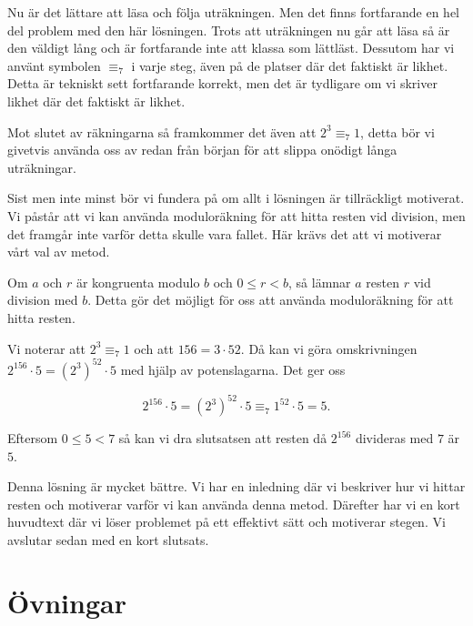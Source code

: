 \documentclass[titlepage]{article}
\begin{document}
Nu är det lättare att läsa och följa uträkningen. Men det finns fortfarande en hel del problem med den här lösningen. Trots att uträkningen nu går att läsa så är den väldigt lång och är fortfarande inte att klassa som lättläst. Dessutom har vi använt symbolen $\equiv_7$ i varje steg, även på de platser där det faktiskt är likhet. Detta är tekniskt sett fortfarande korrekt, men det är tydligare om vi skriver likhet där det faktiskt är likhet. 

Mot slutet av räkningarna så framkommer det även att $2^3 \equiv_7 1$, detta bör vi givetvis använda oss av redan från början för att slippa onödigt långa uträkningar.

Sist men inte minst bör vi fundera på om allt i lösningen är tillräckligt motiverat. Vi påstår att vi kan använda moduloräkning för att hitta resten vid division, men det framgår inte varför detta skulle vara fallet. Här krävs det att vi motiverar vårt val av metod.

\begin{center}
    \begin{tcolorbox}[width=\linewidth,colback={green!25!white},title={\textbf{Lösning 3 - Bättre}},outer arc=0mm,colupper=black]
        Om $a$ och $r$ är kongruenta modulo $b$ och $0\leq r<b$, så lämnar $a$ resten $r$ vid division med $b$. Detta gör det möjligt för oss att använda moduloräkning för att hitta resten. \vspace{2mm}

        Vi noterar att $2^3 \equiv_7 1$ och att $156 = 3\cdot 52$. Då kan vi göra omskrivningen $2^{156}\cdot 5 = (2^3)^{52} \cdot 5$ med hjälp av potenslagarna. Det ger oss

        $$2^{156}\cdot 5 = (2^3)^{52} \cdot 5 \equiv_7 1^{52} \cdot 5 = 5.$$

        Eftersom $0\leq 5<7$ så kan vi dra slutsatsen att resten då $2^{156}$ divideras med $7$ är $5$.
    \end{tcolorbox} 
    \end{center}

Denna lösning är mycket bättre. Vi har en inledning där vi beskriver hur vi hittar resten och motiverar varför vi kan använda denna metod. Därefter har vi en kort huvudtext där vi löser problemet på ett effektivt sätt och motiverar stegen. Vi avslutar sedan med en kort slutsats.




\section{Övningar}
\end{document}
